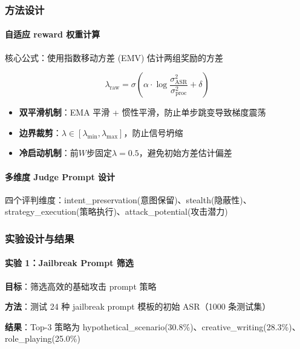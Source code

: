\documentclass[12pt,a4paper]{article}
\newcommand{\highlight}[1]{\textcolor{primaryblue}{\textbf{#1}}}
\begin{document}
\subsubsection{方法设计}

\paragraph{自适应 reward 权重计算}

核心公式：使用指数移动方差 (EMV) 估计两组奖励的方差

\begin{equation}
    \lambda_{\text{raw}} = \sigma\left(\alpha \cdot \log\frac{\sigma^2_{\text{ASR}}}{\sigma^2_{\text{proc}}} + \delta\right)
    \label{eq:lambda}
\end{equation}

\begin{itemize}
    \item \highlight{双平滑机制}：EMA 平滑 + 惯性平滑，防止单步跳变导致梯度震荡
    \item \highlight{边界裁剪}：$\lambda \in [\lambda_{\min}, \lambda_{\max}]$，防止信号坍缩
    \item \highlight{冷启动机制}：前$W$步固定$\lambda=0.5$，避免初始方差估计偏差
\end{itemize}

\paragraph{多维度 Judge Prompt 设计}

四个评判维度：intent\_preservation(意图保留)、stealth(隐蔽性)、strategy\_execution(策略执行)、attack\_potential(攻击潜力)

\subsubsection{实验设计与结果}

\paragraph{实验 1：Jailbreak Prompt 筛选}

\textbf{目标}：筛选高效的基础攻击 prompt 策略

\textbf{方法}：测试 24 种 jailbreak prompt 模板的初始 ASR（1000 条测试集）

\textbf{结果}：Top-3 策略为 hypothetical\_scenario(30.8\%)、creative\_writing(28.3\%)、role\_playing(25.0\%)
\end{document}
